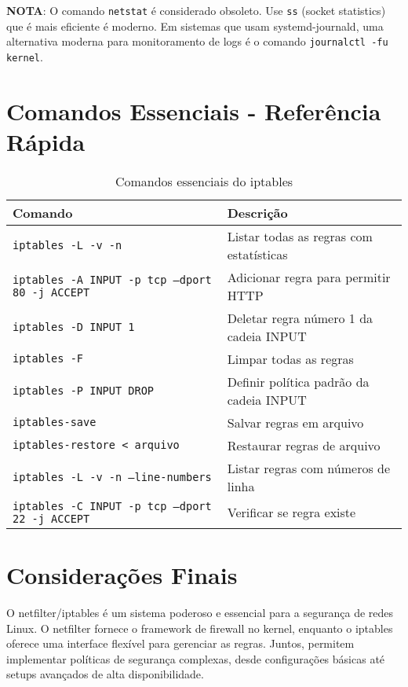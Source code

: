 ﻿\documentclass[12pt,fleqn]{article}
\begin{document}
\textbf{NOTA}: O comando \texttt{netstat} é considerado obsoleto. Use \texttt{ss} (socket statistics) que é mais eficiente é moderno. Em sistemas que usam systemd-journald, uma alternativa moderna para monitoramento de logs é o comando \texttt{journalctl -fu kernel}.

\section{Comandos Essenciais - Referência Rápida}

\begin{table}[H]
\centering
\begin{tabular}{@{}ll@{}}
\toprule
\textbf{Comando} & \textbf{Descrição} \\
\midrule
\texttt{iptables -L -v -n} & Listar todas as regras com estatísticas \\
\texttt{iptables -A INPUT -p tcp --dport 80 -j ACCEPT} & Adicionar regra para permitir HTTP \\
\texttt{iptables -D INPUT 1} & Deletar regra número 1 da cadeia INPUT \\
\texttt{iptables -F} & Limpar todas as regras \\
\texttt{iptables -P INPUT DROP} & Definir política padrão da cadeia INPUT \\
\texttt{iptables-save} & Salvar regras em arquivo \\
\texttt{iptables-restore < arquivo} & Restaurar regras de arquivo \\
\texttt{iptables -L -v -n --line-numbers} & Listar regras com números de linha \\
\texttt{iptables -C INPUT -p tcp --dport 22 -j ACCEPT} & Verificar se regra existe \\
\bottomrule
\end{tabular}
\caption{Comandos essenciais do iptables}
\end{table}

\section{Considerações Finais}

O netfilter/iptables é um sistema poderoso e essencial para a segurança de redes Linux. O netfilter fornece o framework de firewall no kernel, enquanto o iptables oferece uma interface flexível para gerenciar as regras. Juntos, permitem implementar políticas de segurança complexas, desde configurações básicas até setups avançados de alta disponibilidade.
\end{document}
